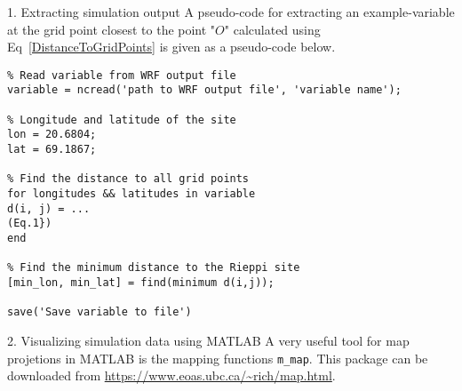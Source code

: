 \documentclass{beamer}
\begin{document}
\begin{frame}[fragile, allowframebreaks=1, t]{1. Extracting simulation output}
A pseudo-code for extracting an example-variable at the grid point closest to the point "$O$" calculated using Eq~\ref{DistanceToGridPoints} is given as a pseudo-code below.
\begin{lstlisting}
% Read variable from WRF output file
variable = ncread('path to WRF output file', 'variable name');

% Longitude and latitude of the site
lon = 20.6804;
lat = 69.1867;

% Find the distance to all grid points
for longitudes && latitudes in variable
d(i, j) = ... 																	(Eq.1})
end

% Find the minimum distance to the Rieppi site
[min_lon, min_lat] = find(minimum d(i,j));

save('Save variable to file')
\end{lstlisting}
\end{frame}



\begin{frame}{2. Visualizing simulation data using MATLAB}
A very useful tool for map projetions in MATLAB is the mapping functions \texttt{m\_map}. This package can be downloaded from \url{https://www.eoas.ubc.ca/~rich/map.html}.


\end{frame}
\end{document}
